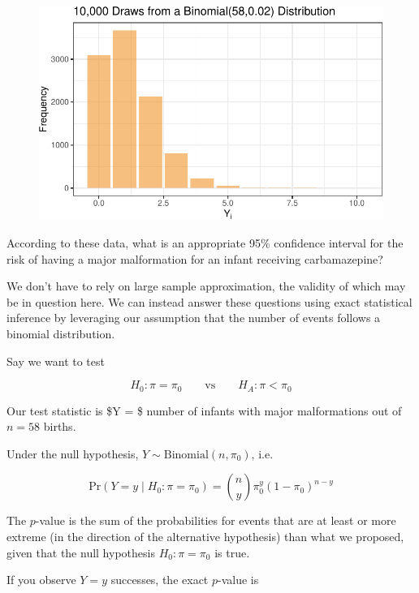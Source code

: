 \documentclass[
  letterpaper,
  DIV=11,
  numbers=noendperiod]{scrreport}
\begin{document}
\begin{figure}[H]

{\centering \includegraphics[width=1\textwidth,height=\textheight]{week8/week8_files/figure-pdf/unnamed-chunk-4-2.pdf}

}

\end{figure}

According to these data, what is an appropriate 95\% confidence interval
for the risk of having a major malformation for an infant receiving
carbamazepine?

We don't have to rely on large sample approximation, the validity of
which may be in question here. We can instead answer these questions
using exact statistical inference by leveraging our assumption that the
number of events follows a binomial distribution.

Say we want to test

\[
H_0 \colon \pi = \pi_0 \quad \quad \text{vs} \quad \quad H_A \colon \pi < \pi_0
\]

Our test statistic is \$Y = \$ number of infants with major
malformations out of \(n = 58\) births.

Under the null hypothesis, \(Y \sim \text{Binomial}(n, \pi_0)\), i.e.

\[\mathrm{Pr}(Y = y \mid H_0 \colon \pi = \pi_0) = 
{n \choose y } \pi_0^y (1-\pi_0)^{n-y}
\]

The \(p\)-value is the sum of the probabilities for events that are at
least or more extreme (in the direction of the alternative hypothesis)
than what we proposed, given that the null hypothesis
\(H_0 \colon \pi = \pi_0\) is true.

If you observe \(Y = y\) successes, the exact \(p\)-value is
\end{document}
